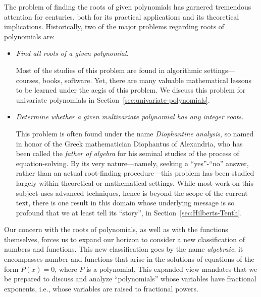 The problem of finding the roots of given polynomials has garnered tremendous attention for centuries, both for its practical applications and its theoretical implications.  Historically, two of the major problems regarding roots of polynomials are:
\begin{itemize}
\item
{\em Find all roots of a given polynomial.}

\smallskip

Most of the studies of this problem are found in algorithmic settings---courses, books, software.  Yet, there are many valuable mathematical lessons to be learned under the aegis of this problem.  We discuss this problem for univariate polynomials in Section~\ref{sec:univariate-polynomials}.

\medskip\item
{\em Determine whether a given multivariate polynomial has any integer roots.}

\smallskip

 
 
This problem is often found under the name {\it Diophantine analysis}, so named in honor of the Greek mathematician Diophantus of Alexandria, who has been called the {\em father of algebra} for his seminal studies of the process of equation-solving.  By its very nature---namely, seeking a ``{\sc yes}''-``{\sc no}'' answer, rather than an actual root-finding procedure---this problem has been studied largely within theoretical or mathematical settings.  While most work on this subject uses advanced techniques, hence is beyond the scope of the current text, there is one result in this domain whose underlying message is so profound that we at least tell its ``story'', in Section~\ref{sec:Hilberts-Tenth}.
\end{itemize}
 

\bigskip

  
Our concern with the roots of polynomials, as well as with the functions themselves, forces us to expand our horizon to consider a new classification of numbers and functions.  This new classification goes by the name {\it algebraic}; it encompasses number and functions that arise in the solutions of equations of the form $P(x) = 0$, where $P$ is a polynomial.  This expanded view mandates that we be prepared to discuss and analyze ``polynomials'' whose variables have fractional exponents, i.e., whose variables are raised to fractional powers.


